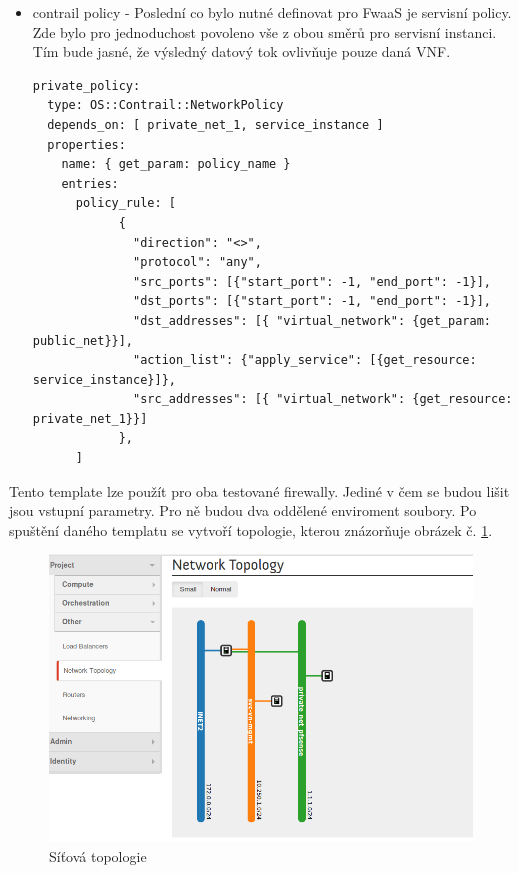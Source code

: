 \begin{itemize}
\item contrail policy - Poslední co bylo nutné definovat pro FwaaS je servisní policy. Zde bylo pro jednoduchost povoleno vše z obou směrů pro servisní instanci. Tím bude jasné, že výsledný datový tok ovlivňuje pouze daná VNF.

\begin{lstlisting}[caption=Contrail network policy]
private_policy:
  type: OS::Contrail::NetworkPolicy
  depends_on: [ private_net_1, service_instance ]
  properties:
    name: { get_param: policy_name }
    entries:
      policy_rule: [
            { 
              "direction": "<>", 
              "protocol": "any", 
              "src_ports": [{"start_port": -1, "end_port": -1}],
              "dst_ports": [{"start_port": -1, "end_port": -1}],
              "dst_addresses": [{ "virtual_network": {get_param: public_net}}], 
              "action_list": {"apply_service": [{get_resource: service_instance}]}, 
              "src_addresses": [{ "virtual_network": {get_resource: private_net_1}}] 
            }, 
      ]
\end{lstlisting}
\end{itemize}

Tento template lze použít pro oba testované firewally. Jediné v čem se budou lišit jsou vstupní parametry. Pro ně budou dva oddělené enviroment soubory. Po spuštění daného templatu se vytvoří topologie, kterou znázorňuje obrázek č. \ref{fig:fwaas_topologie}. 

\begin{figure}[h]
\begin{centering}
\includegraphics[scale=0.45]{images/fwaas_topologie}
\par\end{centering}
\caption{Síťová topologie\label{fig:fwaas_topologie}}
\end{figure}

